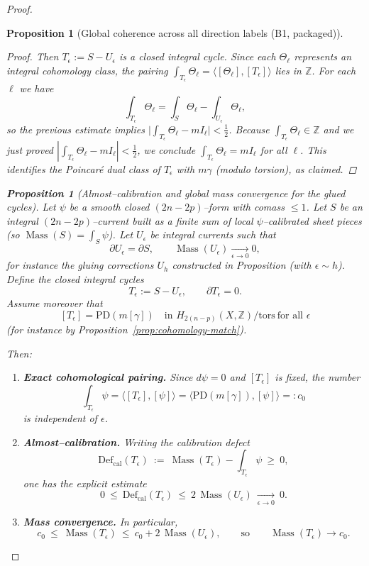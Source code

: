 \documentclass[11pt]{article}
\numberwithin{equation}{section}  %
\theoremstyle{plain}
\newtheorem{proposition}[theorem]{Proposition}
\theoremstyle{definition}
\theoremstyle{remark}
\newcommand{\Z}{\mathbb{Z}}
\DeclareMathOperator{\Mass}{Mass}
\newcommand{\Def}{\mathrm{Def}}
\begin{document}
\begin{proof}
\begin{proposition}[Global coherence across all direction labels (B1, packaged)]
\begin{enumerate}
\begin{proof}
Then $T_\epsilon:=S-U_\epsilon$ is a closed integral cycle. Since each $\Theta_\ell$ represents an integral cohomology class, the pairing $\int_{T_\epsilon}\Theta_\ell=\langle[\Theta_\ell],[T_\epsilon]\rangle$ lies in $\Z$.
For each $\ell$ we have
\[
\int_{T_\epsilon}\Theta_\ell=\int_{S}\Theta_\ell-\int_{U_\epsilon}\Theta_\ell,
\]
so the previous estimate implies $\bigl|\int_{T_\epsilon}\Theta_\ell-mI_\ell\bigr|<\frac12$.
Because $\int_{T_\epsilon}\Theta_\ell\in\Z$ and we just proved $|\int_{T_\epsilon}\Theta_\ell-mI_\ell|<\tfrac12$, we conclude $\int_{T_\epsilon}\Theta_\ell=mI_\ell$ for all $\ell$.
This identifies the Poincar\'e dual class of $T_\epsilon$ with $m\gamma$ (modulo torsion), as claimed.

\end{proof}


\begin{proposition}[Almost--calibration and global mass convergence for the glued cycles]\label{prop:almost-calibration}
Let $\psi$ be a smooth closed $(2n-2p)$--form with comass $\le 1$.
Let $S$ be an integral $(2n-2p)$--current built as a finite sum of local $\psi$--calibrated sheet pieces (so $\Mass(S)=\int_S\psi$).
Let $U_\epsilon$ be integral currents such that
\[
\partial U_\epsilon=\partial S,
\qquad
\Mass(U_\epsilon)\xrightarrow[\epsilon\to 0]{}0,
\]
for instance the gluing corrections $U_h$ constructed in Proposition (with $\epsilon\sim h$).
Define the closed integral cycles
\[
T_\epsilon := S-U_\epsilon,
\qquad
\partial T_\epsilon=0.
\]
Assume moreover that
\[
[T_\epsilon]=\mathrm{PD}(m[\gamma])\quad\text{in }H_{2(n-p)}(X,\Z)/\mathrm{tors}\ \text{for all }\epsilon
\]
(for instance by Proposition~\ref{prop:cohomology-match}).

Then:
\begin{enumerate}
\item[\textnormal{(i)}] \textbf{Exact cohomological pairing.}
Since $d\psi=0$ and $[T_\epsilon]$ is fixed, the number
\[
\int_{T_\epsilon}\psi
=\bigl\langle [T_\epsilon],[\psi]\bigr\rangle
=\bigl\langle \mathrm{PD}(m[\gamma]),[\psi]\bigr\rangle
=:c_0
\]
is independent of $\epsilon$.
\item[\textnormal{(ii)}] \textbf{Almost--calibration.}
Writing the calibration defect
\[
\Def_{\mathrm{cal}}(T_\epsilon)\ :=\ \Mass(T_\epsilon)-\int_{T_\epsilon}\psi\ \ge\ 0,
\]
one has the explicit estimate
\[
0\ \le\ \Def_{\mathrm{cal}}(T_\epsilon)\ \le\ 2\,\Mass(U_\epsilon)\ \xrightarrow[\epsilon\to 0]{}\ 0.
\]
\item[\textnormal{(iii)}] \textbf{Mass convergence.}
In particular,
\[
c_0\ \le\ \Mass(T_\epsilon)\ \le\ c_0+2\,\Mass(U_\epsilon),
\qquad\text{so}\qquad
\Mass(T_\epsilon)\to c_0.
\]
\end{enumerate}
\end{proposition}


\end{enumerate}
\end{proposition}
\end{proof}
\end{document}
